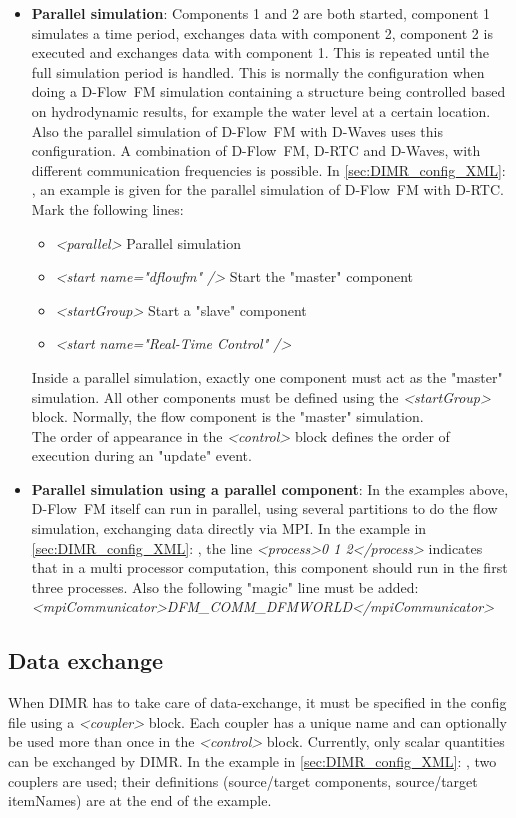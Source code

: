 \documentclass[signature]{deltares_manual}
\newcommand{\dwaves}{D-Waves\xspace}
\newcommand{\dflowfm}{\textrm{D-Flow~FM}\xspace}
\newcommand{\drtc}{D-RTC\xspace}
\newcommand{\dimr}{\textrm{DIMR}\xspace}
\begin{document}
\begin{itemize}
	\item \textbf{Parallel simulation}: Components 1 and 2 are both started, component 1 simulates a time period, exchanges data with component 2, component 2 is executed and exchanges data with component 1. This is repeated until the full simulation period is handled. This is normally the configuration when doing a \dflowfm simulation containing a structure being controlled based on hydrodynamic results, for example the water level at a certain location. Also the parallel simulation of \dflowfm with \dwaves uses this configuration. A combination of \dflowfm, \drtc and \dwaves, with different communication frequencies is possible. In \autoref{sec:DIMR_config_XML}: , an example is given for the parallel simulation of \dflowfm with \drtc. Mark the following lines:
	\begin{itemize}
		\item \textit{<parallel>} Parallel simulation
		\item \textit{\quad<start name="dflowfm" />} Start the "master" component
		\item \textit{\quad<startGroup>} Start a "slave" component
		\item \textit{\qquad<start name="Real-Time Control" />}
	\end{itemize}
	\Note Inside a parallel simulation, exactly one component must act as the "master" simulation. All other components must be defined using the \textit{<startGroup>} block. Normally, the flow component is the "master" simulation. \\
	\Note The order of appearance in the \textit{<control>} block defines the order of execution during an "update" event.
	\item \textbf{Parallel simulation using a parallel component}: In the examples above, \dflowfm itself can run in parallel, using several partitions to do the flow simulation, exchanging data directly via MPI. In the example in \autoref{sec:DIMR_config_XML}: , the line \textit{<process>0 1 2</process>} indicates that in a multi processor computation, this component should run in the first three processes. Also the following "magic" line must be added: \textit{<mpiCommunicator>DFM\_COMM\_DFMWORLD</mpiCommunicator>}
\end{itemize}

\subsection{Data exchange} 
\label{subsec:exchange}
When \dimr has to take care of data-exchange, it must be specified in the config file using a \textit{<coupler>} block. Each coupler has a unique name and can optionally be used more than once in the \textit{<control>} block. Currently, only scalar quantities can be exchanged by \dimr. In the example in \autoref{sec:DIMR_config_XML}: , two couplers are used; their definitions (source/target components, source/target itemNames) are at the end of the example.
\end{document}
